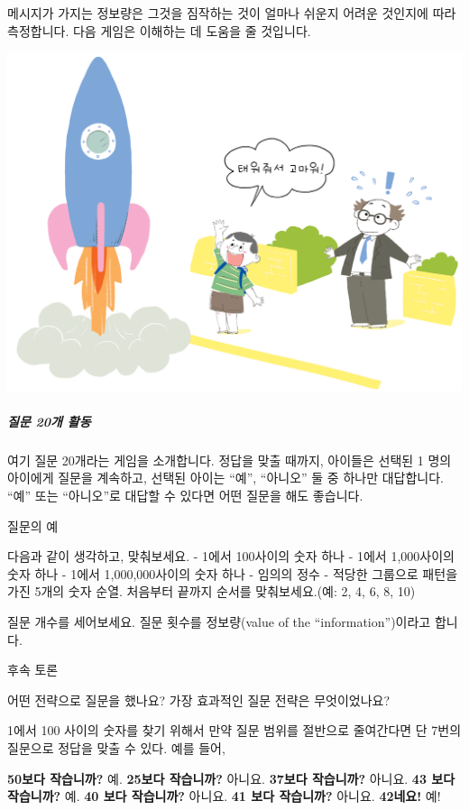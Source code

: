 \documentclass[]{article}
\begin{document}
메시지가 가지는 정보량은 그것을 짐작하는 것이 얼마나 쉬운지 어려운
것인지에 따라 측정합니다. 다음 게임은 이해하는 데 도움을 줄 것입니다.

\includegraphics{csunplugged/01-part/img/ch05-info/05-info-01-spaceship.png}

\subparagraph{질문 20개 활동}\label{section-79}

여기 질문 20개라는 게임을 소개합니다. 정답을 맞출 때까지, 아이들은
선택된 1 명의 아이에게 질문을 계속하고, 선택된 아이는 ``예'', ``아니오''
둘 중 하나만 대답합니다. ``예'' 또는 ``아니오''로 대답할 수 있다면 어떤
질문을 해도 좋습니다.

질문의 예

다음과 같이 생각하고, 맞춰보세요. - 1에서 100사이의 숫자 하나 - 1에서
1,000사이의 숫자 하나 - 1에서 1,000,000사이의 숫자 하나 - 임의의 정수 -
적당한 그룹으로 패턴을 가진 5개의 숫자 순열. 처음부터 끝까지 순서를
맞춰보세요.(예: 2, 4, 6, 8, 10)

질문 개수를 세어보세요. 질문 횟수를 정보량(value of the
``information'')이라고 합니다.

후속 토론

어떤 전략으로 질문을 했나요? 가장 효과적인 질문 전략은 무엇이었나요?

1에서 100 사이의 숫자를 찾기 위해서 만약 질문 범위를 절반으로 줄여간다면
단 7번의 질문으로 정답을 맞출 수 있다. 예를 들어,

\textbf{50보다 작습니까?} 예. \textbf{25보다 작습니까?} 아니요.
\textbf{37보다 작습니까?} 아니요. \textbf{43 보다 작습니까?} 예.
\textbf{40 보다 작습니까?} 아니요. \textbf{41 보다 작습니까?} 아니요.
\textbf{42네요!} 예!
\end{document}
